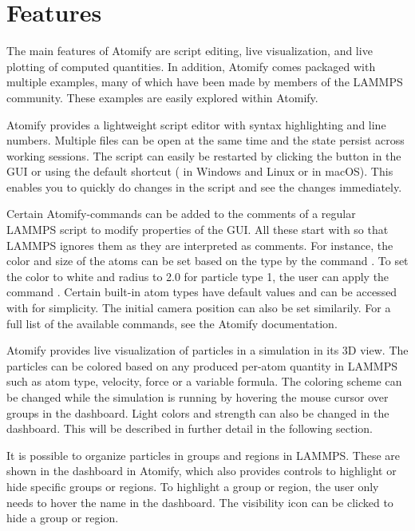 \documentclass[aps,pre,twocolumn,letterpaper,floatfix,nofootinbib]{revtex4}
\begin{document}
\section{Features}
The main features of Atomify are script editing,
live visualization, and live plotting of computed quantities.
In addition, Atomify comes packaged with multiple examples,
many of which have been made by members of the LAMMPS community.
These examples are easily explored within Atomify.

Atomify provides a lightweight script editor with syntax highlighting and line
numbers.
Multiple files can be open at the same time and the state persist across working sessions.
The script can easily be restarted by clicking the button in the GUI or using
the default shortcut ( in Windows and Linux or  in macOS).
This enables you to quickly do changes in the script and see the changes immediately. 

Certain Atomify-commands can be added to the comments of a regular LAMMPS script
to modify properties of the GUI.
All these start with \keys{\texttt{\#}} so that LAMMPS ignores them as they are
interpreted as comments.
For instance, the color and size of the atoms can be set based on the type by
the command .
To set the color to white and radius to 2.0 for particle type 1,
the user can apply the command .
Certain built-in atom types have default values and can be accessed with
 for simplicity.
The initial camera position can also be set similarily.
For a full list of the available commands, see the Atomify
documentation\citep{atomifydocumentation}.

Atomify provides live visualization of particles in a simulation in its 3D view. 
The particles can be colored based on any produced per-atom quantity in LAMMPS such as
atom type, velocity, force or a variable formula.
The coloring scheme can be changed while the simulation is running by hovering
the mouse cursor over groups in the dashboard.
Light colors and strength can also be changed in the dashboard.
This will be described in further detail in the following section.

It is possible to organize particles in groups and regions in LAMMPS.
These are shown in the dashboard in Atomify, which also provides controls to
highlight or hide specific groups or regions.
To highlight a group or region, the user only needs to hover the name in the
dashboard.
The visibility icon can be clicked to hide a group or region.
\end{document}
